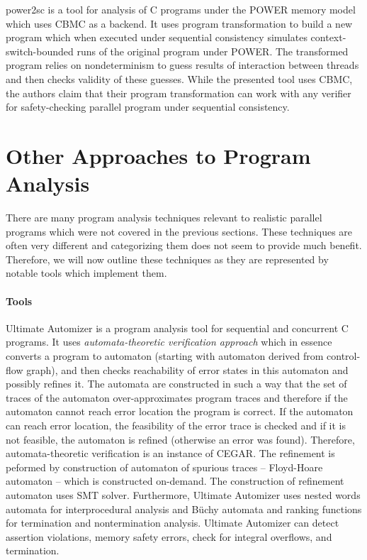 power2sc  is a tool for analysis of C programs under the POWER memory model which uses CBMC as a backend.
It uses program transformation to build a new program which when executed under sequential consistency simulates context-switch-bounded runs of the original program under POWER.
The transformed program relies on nondeterminism to guess results of interaction between threads and then checks validity of these guesses.
While the presented tool uses CBMC, the authors claim that their program transformation can work with any verifier for safety-checking parallel program under sequential consistency.


\section{Other Approaches to Program Analysis}

There are many program analysis techniques relevant to realistic parallel programs which were not covered in the previous sections.
These techniques are often very different and categorizing them does not seem to provide much benefit.
Therefore, we will now outline these techniques as they are represented by notable tools which implement them.

\paragraph{Tools}

Ultimate Automizer  is a program analysis tool for sequential and concurrent C programs.
It uses \emph{automata-theoretic verification approach} which in essence converts a program to automaton (starting with automaton derived from control-flow graph), and then checks reachability of error states in this automaton and possibly refines it.
The automata are constructed in such a way that the set of traces of the automaton over-approximates program traces and therefore if the automaton cannot reach error location the program is correct.
If the automaton can reach error location, the feasibility of the error trace is checked and if it is not feasible, the automaton is refined (otherwise an error was found).
Therefore, automata-theoretic verification is an instance of CEGAR.
The refinement is peformed by construction of automaton of spurious traces -- Floyd-Hoare automaton -- which is constructed on-demand.
The construction of refinement automaton uses SMT solver.
Furthermore, Ultimate Automizer uses nested words automata for interprocedural analysis and Büchy automata and ranking functions for termination and nontermination analysis.
Ultimate Automizer can detect assertion violations, memory safety errors, check for integral overflows, and termination.

